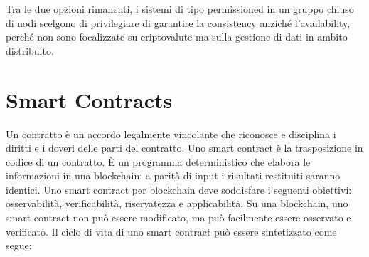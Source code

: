 Tra le due opzioni rimanenti, i sistemi di tipo permissioned in un gruppo chiuso di nodi scelgono di privilegiare di garantire la consistency anziché l'availability, perché non sono focalizzate su criptovalute ma sulla gestione di dati in ambito distribuito.


\section{Smart Contracts}
Un contratto è un accordo legalmente vincolante che riconosce e disciplina i diritti e i doveri delle parti del contratto. Uno smart contract è la trasposizione in codice di un contratto. È un programma deterministico che elabora le informazioni in una blockchain: a parità di input i risultati restituiti saranno identici. Uno smart contract per blockchain deve soddisfare i seguenti obiettivi: osservabilità, verificabilità, riservatezza e applicabilità. Su una blockchain, uno smart contract non può essere modificato, ma può facilmente essere osservato e verificato. Il ciclo di vita di uno smart contract può essere sintetizzato come segue:
